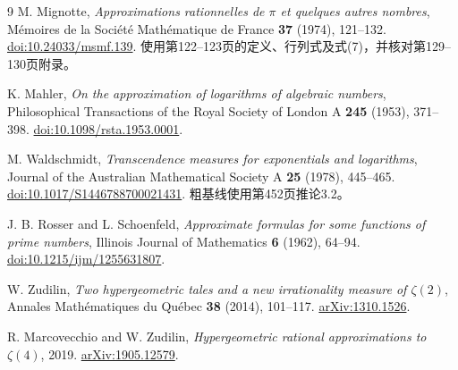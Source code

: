 \documentclass[UTF8,fontset=fandol,a4paper,11pt]{ctexart}
\theoremstyle{remark}
\numberwithin{equation}{section}
\begin{document}
\begin{thebibliography}{9}
M. Mignotte,
\emph{Approximations rationnelles de $\pi$ et quelques autres nombres},
Mémoires de la Société Mathématique de France \textbf{37} (1974), 121--132.
\href{https://doi.org/10.24033/msmf.139}{doi:10.24033/msmf.139}.
使用第122--123页的定义、行列式及式(7)，并核对第129--130页附录。

K. Mahler,
\emph{On the approximation of logarithms of algebraic numbers},
Philosophical Transactions of the Royal Society of London A
\textbf{245} (1953), 371--398.
\href{https://doi.org/10.1098/rsta.1953.0001}{doi:10.1098/rsta.1953.0001}.

M. Waldschmidt,
\emph{Transcendence measures for exponentials and logarithms},
Journal of the Australian Mathematical Society A
\textbf{25} (1978), 445--465.
\href{https://doi.org/10.1017/S1446788700021431}{doi:10.1017/S1446788700021431}.
粗基线使用第452页推论3.2。

J. B. Rosser and L. Schoenfeld,
\emph{Approximate formulas for some functions of prime numbers},
Illinois Journal of Mathematics \textbf{6} (1962), 64--94.
\href{https://doi.org/10.1215/ijm/1255631807}{doi:10.1215/ijm/1255631807}.

W. Zudilin,
\emph{Two hypergeometric tales and a new irrationality measure of $\zeta(2)$},
Annales Mathématiques du Québec \textbf{38} (2014), 101--117.
\href{https://arxiv.org/abs/1310.1526}{arXiv:1310.1526}.

R. Marcovecchio and W. Zudilin,
\emph{Hypergeometric rational approximations to $\zeta(4)$},
2019.
\href{https://arxiv.org/abs/1905.12579}{arXiv:1905.12579}.
\end{thebibliography}
\end{document}
